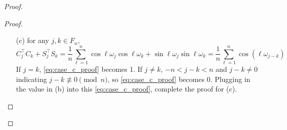 \begin{proof}
\begin{lem}
\begin{proof}
\begin{enumerate}
\begin{equation}
\end{equation}
For the other cases, $j+k\not \equiv 0 \pmod{n}$ and $j-k \not \equiv 0 \pmod{n}$, equation \eqref{eq:case_b_proof} becomes 0. 
\item[(c)] for any $j,k\in F_n$, 
\begin{equation}
\label{eq:case_c_proof}
C_j^\top C_k + S_j^\top S_k = \frac{1}{n}\sum_{\ell=1}^n \cos \ell\omega_j \cos \ell\omega_k + \sin \ell\omega_j\sin \ell\omega_k = \frac{1}{n}\sum_{\ell=1}^n \cos (\ell\omega_{j-k})
\end{equation}
If $j=k$, \eqref{eq:case_c_proof} becomes 1. If $j\neq k$, $-n<j-k<n$ and $j-k\neq 0$ indicating $j-k\not \equiv 0 \pmod{n}$, so \eqref{eq:case_c_proof} becomes 0. Plugging in the value in (b) into this \eqref{eq:case_c_proof}, complete the proof for (c). 
\end{enumerate}
\end{proof}
\end{lem}



\end{proof}
